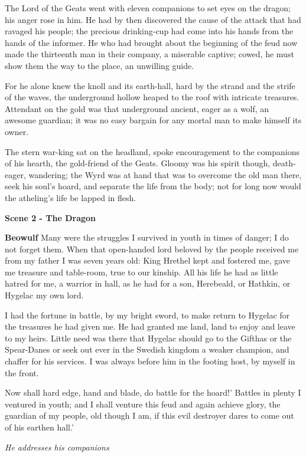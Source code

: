 \documentclass[a4paper]{article}
\begin{document}
{The Lord of the Geats went with eleven companions
to set eyes on the dragon; his anger rose in him.
He had by then discovered the cause of the attack
that had ravaged his people; the precious drinking-cup
had come into his hands from the hands of the informer.
He who had brought about the beginning of the feud
now made the thirteenth man in their company,
a miserable captive; cowed, he must show them
the way to the place, an unwilling guide.

For he alone knew the knoll and its earth-hall,
hard by the strand and the strife of the waves,
the underground hollow heaped to the roof
with intricate treasures. Attendant on the gold
was that underground ancient, eager as a wolf,
an awesome guardian; it was no easy bargain
for any mortal man to make himself its owner.

The stern war-king sat on the headland,
spoke encouragement to the companions of his hearth,
the gold-friend of the Geats. Gloomy was his spirit though,
death-eager, wandering; the Wyrd was at hand
that was to overcome the old man there,
seek his soul’s hoard, and separate
the life from the body; not for long now
would the atheling’s life be lapped in flesh.

\centerline{\textbf{Scene 2 - The Dragon}}

\textbf{Beowulf} Many were the struggles I survived in youth
in times of danger; I do not forget them.
When that open-handed lord beloved by the people
received me from my father I was seven years old:
King Hrethel kept and fostered me,
gave me treasure and table-room, true to our kinship.
All his life he had as little hatred for me,
 a warrior in hall, as he had for a son,
Herebeald, or Hathkin, or Hygelac my own lord.

 I had the fortune in battle, by my bright sword,
to make return to Hygelac for the treasures he had given me.
He had granted me land, land to enjoy
and leave to my heirs. Little need was there
that Hygelac should go to the Gifthas or the Spear-Danes
or seek out ever in the Swedish kingdom
a weaker champion, and chaffer for his services.
I was always before him in the footing host,
by myself in the front.

Now shall hard edge,
hand and blade, do battle for the hoard!’
Battles in plenty
I ventured in youth; and I shall venture this feud
and again achieve glory, the guardian of my people,
old though I am, if this evil destroyer
dares to come out of his earthen hall.’

\centerline{\textit{He addresses his companions}}

}
\end{document}

